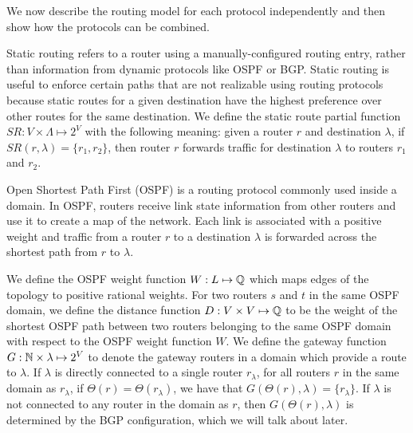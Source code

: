 We now describe
the routing model for each protocol independently
and then show how the protocols can be combined. 



 Static routing refers to a router using a
manually-configured routing entry, rather than information from
dynamic protocols like OSPF or BGP.  Static routing is useful to enforce certain
paths that are not realizable using routing protocols because 
static
routes for a given destination have the highest preference over other routes for the same destination.  
We define the static route partial
function $SR: V \times \Lambda \mapsto 2^V$ with the following meaning:  
given a router $r$
and destination $\lambda$, if $SR(r,\lambda)=\{r_1, r_2\}$, then router
$r$ forwards traffic for 
destination $\lambda$ to routers 
$r_1$ and $r_2$.    

 Open Shortest Path First (OSPF) is a routing
protocol commonly used inside a domain. In OSPF, routers receive link
state information from other routers and use it to create a map of
the network. Each link is associated with a positive weight and traffic from a router $r$ to
a destination $\lambda$ is forwarded across 
the shortest path from $r$ to $\lambda$.

We define the OSPF weight function $W: L \mapsto \mathbb{Q}$ which 
maps edges of the topology to positive rational weights.  
For two routers $s$ and $t$ in the same OSPF domain, 
we define the distance function $D:V \times V \mapsto \mathbb{Q}$ 
to be the weight of the shortest OSPF path between two routers
belonging to the same OSPF domain with respect to the  
OSPF weight function $W$.
We define the gateway function 
$G: \mathbb{N} \times \lambda \mapsto 2^V$ to denote the gateway routers 
in a domain which provide a route to $\lambda$. If $\lambda$ 
is directly connected to a single router $r_\lambda$, for all routers $r$ in the 
same domain as $r_\lambda$,
if 
$\Theta(r) = \Theta(r_\lambda)$, we have that $G(\Theta(r), \lambda) = \{r_\lambda\}$.
If $\lambda$ is not connected
to any router in the domain as $r$, then $G(\Theta(r),\lambda)$ is 
determined by the BGP configuration, which we will talk about later. 




